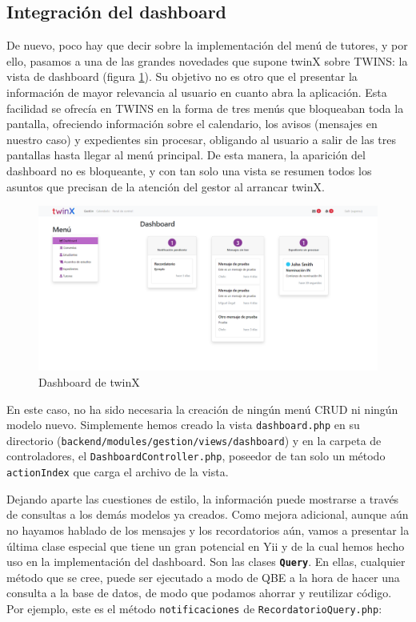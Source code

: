 \subsection{Integración del dashboard}

De nuevo, poco hay que decir sobre la implementación del menú de tutores, y por ello, pasamos a una de las grandes novedades que supone twinX sobre TWINS: la vista de dashboard (figura \ref{fig:dashboardtwinX}). Su objetivo no es otro que el presentar la información de mayor relevancia al usuario en cuanto abra la aplicación. Esta facilidad se ofrecía en TWINS en la forma de tres menús que bloqueaban toda la pantalla, ofreciendo información sobre el calendario, los avisos (mensajes en nuestro caso) y expedientes sin procesar, obligando al usuario a salir de las tres pantallas hasta llegar al menú principal. De esta manera, la aparición del dashboard no es bloqueante, y con tan solo una vista se resumen todos los asuntos que precisan de la atención del gestor al arrancar twinX.

\begin{figure}
	\centering
	\includegraphics[width=\linewidth]{img/Capturas de twinX/dashboard}
	\caption{Dashboard de twinX}
	\label{fig:dashboardtwinX}
\end{figure}

En este caso, no ha sido necesaria la creación de ningún menú CRUD ni ningún modelo nuevo. Simplemente hemos creado la vista \texttt{dashboard.php} en su directorio (\texttt{backend/modules/gestion/views/dashboard}) y en la carpeta de controladores, el \texttt{DashboardController.php}, poseedor de tan solo un método \texttt{actionIndex} que carga el archivo de la vista.

Dejando aparte las cuestiones de estilo, la información puede mostrarse a través de consultas a los demás modelos ya creados. Como mejora adicional, aunque aún no hayamos hablado de los mensajes y los recordatorios aún, vamos a presentar la última clase especial que tiene un gran potencial en Yii y de la cual hemos hecho uso en la implementación del dashboard. Son las clases \textbf{\texttt{Query}}. En ellas, cualquier método que se cree, puede ser ejecutado a modo de QBE a la hora de hacer una consulta a la base de datos, de modo que podamos ahorrar y reutilizar código. Por ejemplo, este es el método \texttt{notificaciones} de \texttt{RecordatorioQuery.php}:


